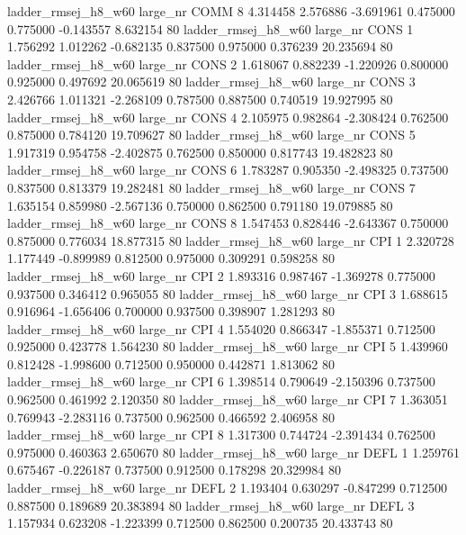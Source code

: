ladder_rmsej_h8_w60   large_nr     COMM                 8  4.314458  2.576886  -3.691961 0.475000 0.775000 -0.143557    8.632154 80
ladder_rmsej_h8_w60   large_nr     CONS                 1  1.756292  1.012262  -0.682135 0.837500 0.975000  0.376239   20.235694 80
ladder_rmsej_h8_w60   large_nr     CONS                 2  1.618067  0.882239  -1.220926 0.800000 0.925000  0.497692   20.065619 80
ladder_rmsej_h8_w60   large_nr     CONS                 3  2.426766  1.011321  -2.268109 0.787500 0.887500  0.740519   19.927995 80
ladder_rmsej_h8_w60   large_nr     CONS                 4  2.105975  0.982864  -2.308424 0.762500 0.875000  0.784120   19.709627 80
ladder_rmsej_h8_w60   large_nr     CONS                 5  1.917319  0.954758  -2.402875 0.762500 0.850000  0.817743   19.482823 80
ladder_rmsej_h8_w60   large_nr     CONS                 6  1.783287  0.905350  -2.498325 0.737500 0.837500  0.813379   19.282481 80
ladder_rmsej_h8_w60   large_nr     CONS                 7  1.635154  0.859980  -2.567136 0.750000 0.862500  0.791180   19.079885 80
ladder_rmsej_h8_w60   large_nr     CONS                 8  1.547453  0.828446  -2.643367 0.750000 0.875000  0.776034   18.877315 80
ladder_rmsej_h8_w60   large_nr      CPI                 1  2.320728  1.177449  -0.899989 0.812500 0.975000  0.309291    0.598258 80
ladder_rmsej_h8_w60   large_nr      CPI                 2  1.893316  0.987467  -1.369278 0.775000 0.937500  0.346412    0.965055 80
ladder_rmsej_h8_w60   large_nr      CPI                 3  1.688615  0.916964  -1.656406 0.700000 0.937500  0.398907    1.281293 80
ladder_rmsej_h8_w60   large_nr      CPI                 4  1.554020  0.866347  -1.855371 0.712500 0.925000  0.423778    1.564230 80
ladder_rmsej_h8_w60   large_nr      CPI                 5  1.439960  0.812428  -1.998600 0.712500 0.950000  0.442871    1.813062 80
ladder_rmsej_h8_w60   large_nr      CPI                 6  1.398514  0.790649  -2.150396 0.737500 0.962500  0.461992    2.120350 80
ladder_rmsej_h8_w60   large_nr      CPI                 7  1.363051  0.769943  -2.283116 0.737500 0.962500  0.466592    2.406958 80
ladder_rmsej_h8_w60   large_nr      CPI                 8  1.317300  0.744724  -2.391434 0.762500 0.975000  0.460363    2.650670 80
ladder_rmsej_h8_w60   large_nr     DEFL                 1  1.259761  0.675467  -0.226187 0.737500 0.912500  0.178298   20.329984 80
ladder_rmsej_h8_w60   large_nr     DEFL                 2  1.193404  0.630297  -0.847299 0.712500 0.887500  0.189689   20.383894 80
ladder_rmsej_h8_w60   large_nr     DEFL                 3  1.157934  0.623208  -1.223399 0.712500 0.862500  0.200735   20.433743 80
